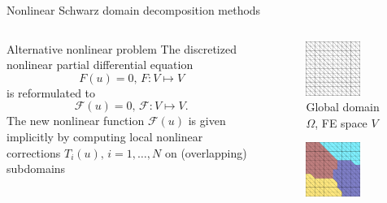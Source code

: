 \begin{frame}[noframenumbering]{Nonlinear Schwarz domain decomposition methods}%
	\vspace{-5mm}
	\begin{columns}
		\begin{column}{0.7\textwidth}
			\centering
			\begin{block}{\normalsize Alternative nonlinear problem}
				The discretized nonlinear partial differential equation
				\begin{equation*}
					F(u) = 0,\, F : V\mapsto V
				\end{equation*}
				is reformulated to
				\begin{equation*}
					\mathcal{F}(u) = 0,\, \mathcal{F} : V\mapsto V.
				\end{equation*}
				The new nonlinear function $\mathcal{F}(u)$ is given implicitly by computing local nonlinear corrections $T_i(u),\,i = 1,\dots,N$ on (overlapping) subdomains
			\end{block}
		\end{column}
		\begin{column}{0.3\textwidth}
			\begin{figure}
				\includegraphics[height=0.4\textwidth,width=0.7\textwidth]{images/DD-mesh-1.png}
				\vspace{-2mm}
				\caption{\tiny Global domain $\Omega$, FE space $V$}
			\end{figure}
			\vspace{-6mm}
			\begin{figure}
				\includegraphics[height=0.4\textwidth,width=0.7\textwidth]{images/DD-mesh-2.png}

\end{figure}
\end{column}
\end{columns}
\end{frame}
